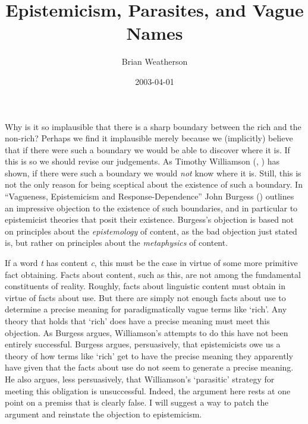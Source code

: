 \documentclass[
  11pt,
  letterpaper,
  DIV=11,
  numbers=noendperiod,
  oneside]{scrartcl}
\title{Epistemicism, Parasites, and Vague Names}
\author{Brian Weatherson}
\date{2003-04-01}
\begin{document}
\maketitle
Why is it so implausible that there is a sharp boundary between the rich
and the non-rich? Perhaps we find it implausible merely because we
(implicitly) believe that if there were such a boundary we would be able
to discover where it is. If this is so we should revise our judgements.
As Timothy Williamson (,
) has shown, if there were
such a boundary we would \emph{not} know where it is. Still, this is not
the only reason for being sceptical about the existence of such a
boundary. In ``Vagueness, Epistemicism and Response-Dependence'' John
Burgess () outlines an impressive
objection to the existence of such boundaries, and in particular to
epistemicist theories that posit their existence. Burgess's objection is
based not on principles about the \emph{epistemology} of content, as the
bad objection just stated is, but rather on principles about the
\emph{metaphysics} of content.

If a word \emph{t} has content \emph{c}, this must be the case in virtue
of some more primitive fact obtaining. Facts about content, such as
this, are not among the fundamental constituents of reality. Roughly,
facts about linguistic content must obtain in virtue of facts about use.
But there are simply not enough facts about use to determine a precise
meaning for paradigmatically vague terms like `rich'. Any theory that
holds that `rich' does have a precise meaning must meet this objection.
As Burgess argues, Williamson's attempts to do this have not been
entirely successful. Burgess argues, persuasively, that epistemicists
owe us a theory of how terms like `rich' get to have the precise meaning
they apparently have given that the facts about use do not seem to
generate a precise meaning. He also argues, less persuasively, that
Williamson's `parasitic' strategy for meeting this obligation is
unsuccessful. Indeed, the argument here rests at one point on a premiss
that is clearly false. I will suggest a way to patch the argument and
reinstate the objection to epistemicism.
\end{document}
